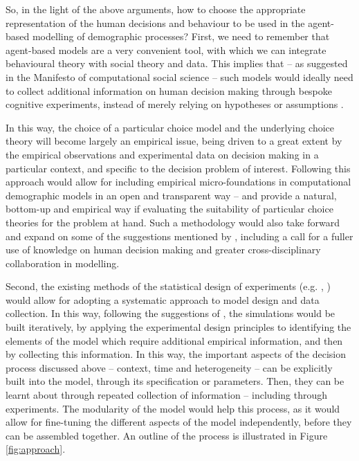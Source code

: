 \documentclass{article}
\begin{document}
So, in the light of the above arguments, how to choose the appropriate representation of the human decisions and behaviour to be used in the agent-based modelling of demographic processes? First, we need to remember that agent-based models are a very convenient tool, with which we can integrate behavioural theory with social theory and data. This implies that -- as suggested in the Manifesto of computational social science \citep{Conte} -- such models would ideally need to collect additional information on human decision making through bespoke cognitive experiments, instead of merely relying on hypotheses or assumptions \citep{Courgeau}. 

In this way, the choice of a particular choice model and the underlying choice theory will become largely an empirical issue, being driven to a great extent by the empirical observations and experimental data on decision making in a particular context, and specific to the decision problem of interest. Following this approach would allow for including empirical micro-foundations in computational demographic models in an open and transparent way -- and provide a natural, bottom-up and empirical way if evaluating the suitability of particular choice theories for the problem at hand. Such a methodology would also take forward and expand on some of the suggestions mentioned by \citet{Groeneveld}, including a call for a fuller use of knowledge on human decision making and greater cross-disciplinary collaboration in modelling.

Second, the existing methods of the statistical design of experiments (e.g. \citeauthor{Chaloner} \citeyear{Chaloner}, \citeauthor{Kleijnen2000} \citeyear{Kleijnen2000}) would allow for adopting a systematic approach to model design and data collection. In this way, following the suggestions of \citet{Courgeau}, the simulations would be built iteratively, by applying the experimental design principles to identifying the elements of the model which require additional empirical information, and then by collecting this information.  In this way, the important aspects of the decision process discussed above – context, time and heterogeneity – can be explicitly built into the model, through its specification or parameters. Then, they can be learnt about through repeated collection of information – including through experiments. The modularity of the model would help this process, as it would allow for fine-tuning the different aspects of the model independently, before they can be assembled together. An outline of the process is illustrated in Figure \ref{fig:approach}.
\end{document}
